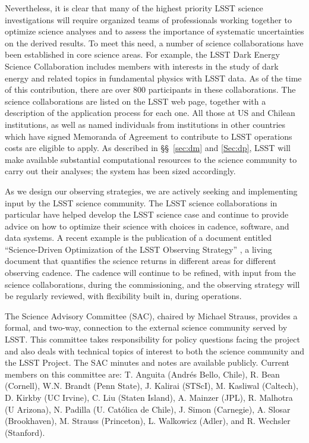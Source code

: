 Nevertheless, it is clear that many of the highest priority LSST science
investigations will require organized teams of professionals working together
to optimize science analyses and to assess the importance of systematic
uncertainties on the derived results. To meet this need, a number of science
collaborations have been established in core science
areas. For example, the LSST Dark Energy Science Collaboration includes
members with interests in the study of dark energy and related topics in
fundamental physics with LSST data. As of the time of this contribution, there are
over 800 participants in these collaborations. %
The science collaborations are listed on the LSST web page, together
with a description of the application process for each one.
All those at US and Chilean institutions,
as well as named individuals from institutions in other countries
which have signed Memoranda of Agreement to contribute to LSST
operations costs are eligible to apply. As described in
\S\S~\ref{sec:dm} and \ref{Sec:dp}, LSST will make available
substantial computational resources to the
science community to carry out their analyses;
the system has been sized accordingly.

As we design our observing strategies, we are actively seeking and implementing
input by the LSST science community.  The LSST science collaborations
in particular have helped develop the LSST science case and continue
to provide advice on how to optimize their science with choices in
cadence, software,
and data systems. A recent example is the publication of a document
entitled ``Science-Driven Optimization of the LSST Observing
Strategy'' \cite{2017arXiv170804058L}, a living document that
quantifies the science returns in different areas for different
observing cadence.  The cadence will continue to be refined, with
input from the science collaborations, during the commissioning, and
the observing strategy will be regularly reviewed, with flexibility
built in, during operations.

The Science Advisory Committee (SAC), chaired by Michael Strauss,
provides a formal, and two-way, connection to the external science
community served by LSST. This committee takes responsibility for
policy questions facing the project and also deals with technical
topics of interest to both the science community and the LSST
Project. The SAC minutes and notes are available
publicly. Current members on this committee are: T. Anguita (Andr\'es
Bello, Chile), R. Bean (Cornell), W.N. Brandt
(Penn State), J. Kalirai (STScI), M. Kasliwal
(Caltech), D. Kirkby (UC Irvine), C. Liu (Staten Island), A. Mainzer
(JPL), R. Malhotra (U Arizona),
N. Padilla (U. Cat\'olica de Chile), J. Simon (Carnegie), A. Slosar
(Brookhaven), M. Strauss (Princeton), L. Walkowicz (Adler),
and R. Wechsler (Stanford).
